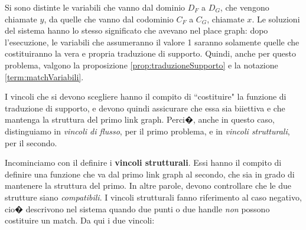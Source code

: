 Si sono distinte le variabili che vanno dal dominio $D_F$ a $D_G$, che vengono chiamate $y$, da quelle che vanno dal codominio $C_F$ a $C_G$, chiamate $x$.
Le soluzioni del sistema hanno lo stesso significato che avevano nel place graph: dopo l'esecuzione, le variabili che assumeranno il valore 1 saranno solamente quelle che costituiranno la vera e propria traduzione di supporto. Quindi, anche per questo problema, valgono la proposizione \ref{prop:traduzioneSupporto} e la notazione \ref{term:matchVariabili}.

I vincoli che si devono scegliere hanno il compito di ``costituire" la funzione di traduzione di supporto, e devono quindi assicurare che essa sia biiettiva e che mantenga la struttura del primo link graph. Perci�, anche in questo caso, distinguiamo in \emph{vincoli di flusso}, per il primo problema, e in \emph{vincoli strutturali}, per il secondo.

Incominciamo con il definire i \textbf{vincoli strutturali}. Essi hanno il compito di definire una funzione che va dal primo link graph al secondo, che sia in grado di mantenere la struttura del primo. In altre parole, devono controllare che le due strutture siano \emph{compatibili}. I vincoli strutturali fanno riferimento al caso negativo, cio� descrivono nel sistema quando due punti o due handle \emph{non} possono costituire un match. Da qui i due vincoli:

